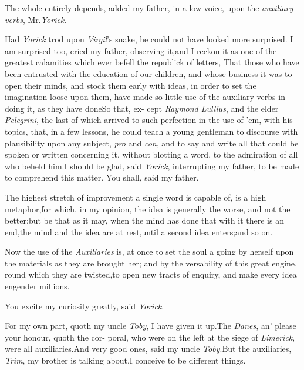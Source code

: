 \documentclass{article}
\begin{document}
\tsh The whole entirely depends, add\-ed my father, in a
low voice, upon the \textit{auxiliary verbs}, Mr.\@ \textit{Yorick}.

Had \textit{Yorick} trod upon \textit{Virgil}\kern 0.5pt’s snake,
he could not have looked more surprised.\break
\tsk I am surprised too, cried my father,\break
observing it,\tsk and I reckon it as one of the
greatest calamities which ever befell the republick of letters, That
those who have been entrusted with the education of our children,
and whose business it was to open their minds, and stock them early
with ideas, in order to set the ima\-gination loose upon them, have
made so little use of the auxiliary verbs in doing it, as they have
done\tsh So that, ex- cept \textit{Raymond Lullius}, and the
elder \textit{Pe\-legrini}, the last of which arrived to such
perfection in the use of ’em, with his to\-pics, that, in a few
lessons, he could teach a young gentleman to discourse with
plausibility upon any subject, \textit{pro} and \textit{con}, and to
say and write all that could be spoken or written concerning it,
without blotting a word, to the admiration of all who beheld
him.\tsk I should be glad, said \textit{Yorick}, interrupting my father,
to be made to comprehend this matter. You shall, said my
father.

The highest stretch of improvement a single word is capable of,
is a high metaphor,\tsh for which, in my opinion, the idea
is generally the worse, and not the better;\tsh but be
that as it may, 
\tsk when the mind has done that with it\break
\tsk there is an end,\tsk the mind and the\break
idea are at rest,\tsk until a second idea enters;\tsk and so on.

Now the use of the \textit{Auxiliaries} is, at once to set the
soul a going by herself upon the materials as they are brought her;
and by the versability of this great engine, round which they are
twisted,\break to open new tracts of enquiry, and make every idea
engender millions.

You excite my curiosity greatly, said \textit{Yorick}.

For my own part, quoth my uncle\break
\textit{Toby}, I have given it up.\tsh The \textit{Danes},\break
an’ please your honour, quoth the cor-
poral, who were on the left at the siege of \textit{Limerick}, were all
auxiliaries.\tsh And very good ones, said my uncle
\textit{Toby}.\tsk But the auxiliaries, \textit{Trim}, my brother is
talking about,\tsk I conceive to be different
things.\tsh
\end{document}
